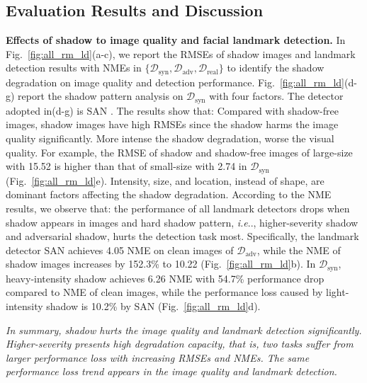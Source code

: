 \documentclass[10pt,twocolumn,letterpaper]{article}
\makeatletter
\newcommand{\figref}[1]{Fig.~\ref{#1}}
\DeclareRobustCommand\onedot{\futurelet\@let@token\@onedot}
\def\@onedot{\ifx\@let@token.\else.\null\fi\xspace}
\def\ie{\emph{i.e}\onedot} \def\Ie{\emph{I.e}\onedot}
\renewcommand{\paragraph}[1]{\vspace{1.25mm}\noindent\textbf{#1}}
\makeatother
\begin{document}
\subsection{Evaluation Results and Discussion}

\paragraph{Effects of shadow to image quality and facial landmark detection.} In \figref{fig:all_rm_ld}(a-c), we report the RMSEs of shadow images and landmark detection results with NMEs in $\{\mathcal{D}_\text{syn}, \mathcal{D}_\text{adv}, \mathcal{D}_\text{real}\}$ to identify the shadow degradation on image quality and detection performance. \figref{fig:all_rm_ld}(d-g) report the shadow pattern analysis on $\mathcal{D}_\text{syn}$ with four factors. The detector adopted in(d-g) is SAN \cite{dong2018style}. The results show that:
%
 Compared with shadow-free images, shadow images have high RMSEs since the shadow harms the image quality significantly. More intense the shadow degradation, worse the visual quality. For example, the RMSE of shadow and shadow-free images of large-size with 15.52 is higher than that of small-size with 2.74 in $\mathcal{D}_\text{syn}$ (\figref{fig:all_rm_ld}e). Intensity, size, and location, instead of shape, are dominant factors affecting the shadow degradation.
%
 According to the NME results, we observe that: the performance of all landmark detectors drops when shadow appears in images and hard shadow pattern, \ie, higher-severity shadow and adversarial shadow, hurts the detection task most. Specifically, the landmark detector SAN \cite{dong2018style} achieves 4.05 NME on clean images of $\mathcal{D}_\text{adv}$, while the NME of shadow images increases by 152.3\% to 10.22 (\figref{fig:all_rm_ld}b). In $\mathcal{D}_\text{syn}$, heavy-intensity shadow achieves 6.26 NME with 54.7\% performance drop compared to NME of clean images, while the performance loss caused by light-intensity shadow is 10.2\% by SAN \cite{dong2018style} (\figref{fig:all_rm_ld}d). 
%

\textit{In summary, shadow hurts the image quality and landmark detection significantly. Higher-severity presents high degradation capacity, that is, two tasks suffer from larger performance loss with increasing RMSEs and NMEs. The same performance loss trend appears in the image quality and landmark detection.}
%
\end{document}
